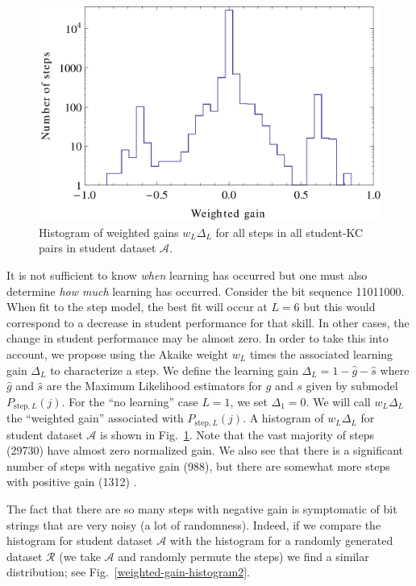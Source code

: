 \documentclass[prodmode,acmtecs]{acmsmall}
\begin{document}
\begin{figure}
  \centering \includegraphics{weighted-gain-histogram.eps}
   \caption{Histogram of weighted gains $w_L \Delta_L$ for
     all steps in all student-KC pairs in student dataset $\mathcal{A}$.}
    \label{weighted-gain-histogram}
\end{figure}

It is not sufficient to know {\it when} learning has occurred but 
one must also determine {\it how much} learning has occurred.  
Consider the bit sequence 11011000.   When fit to the step model,  
the best fit will occur at $L=6$ but this would correspond to a
decrease in student performance for that skill.  In other cases, the 
change in student performance may be almost zero.  
In order to take this into account, we propose 
using the Akaike weight $w_L$ times the associated learning gain $\Delta_L$
to characterize a step.
We define the learning gain $\Delta_L=1-\hat{g}-\hat{s}$ where $\hat{g}$ and $\hat{s}$
are the Maximum Likelihood estimators for $g$ and $s$ given
by submodel  $P_{\mathrm{step},L}(j)$.   For the ``no learning''
case $L=1$, we set $\Delta_1=0$.
We will call  $w_L \Delta_L$ the ``weighted gain'' associated with 
$P_{\mathrm{step},L}(j)$.
A histogram of $w_L \Delta_L$ for student dataset $\mathcal{A}$ is
shown in Fig.~\ref{weighted-gain-histogram}.  Note that the vast
majority of steps (29730) have almost zero normalized gain.  
We also see that there
is a significant number of steps with negative gain (988),
but there are somewhat more steps with positive gain (1312) .

The fact that there are so many steps with negative gain is
symptomatic of bit strings that are very noisy (a lot of
randomness).  Indeed, if we compare the histogram for student
dataset $\mathcal{A}$ with the histogram for a randomly 
generated dataset $\mathcal{R}$ (we take $\mathcal{A}$ and
randomly permute the steps) we find a similar distribution;
see Fig.~\ref{weighted-gain-histogram2}.
\end{document}
